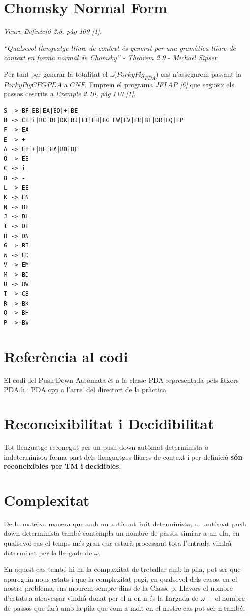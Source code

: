 \documentclass[12pt,a4paper]{report}
\def \w{$\omega$}
\def \pdaCFG{$PorkyPigCFG{PDA} $}
\def \pda{$PorkyPig_{PDA} $}
\begin{document}
\section{Chomsky Normal Form}

\textit{Veure Definició 2.8, pàg 109 [1]}.

\textit{“Qualsevol llenguatge lliure de context és generat per una gramàtica lliure de context en forma normal de Chomsky” - Theorem 2.9 - Michael Sipser}.

Per tant per generar la totalitat el L(\pda{}) ens n’assegurem passant la \pdaCFG{} a $CNF$. Emprem el programa \textit{JFLAP [6]} que segueix els passos descrits a \textit{Exemple 2.10, pàg 110 [1]}.

\begin{lstlisting}
S -> BF|EB|EA|BO|+|BE
B -> CB|i|BC|DL|DK|DJ|EI|EH|EG|EW|EV|EU|BT|DR|EQ|EP
F -> EA
E -> +
A -> EB|+|BE|EA|BO|BF
O -> EB
C -> i
D -> -
L -> EE
K -> EN
N -> BE
J -> BL
I -> DE
H -> DN
G -> BI
W -> ED
V -> EM
M -> BD
U -> BW
T -> CB
R -> BK
Q -> BH
P -> BV
\end{lstlisting}

\section{Referència al codi}

El codi del Push-Down Automata és a la classe PDA representada pels fitxers PDA.h i PDA.cpp a l'arrel del directori de la pràctica.

\section{Reconeixibilitat i Decidibilitat}

Tot llenguatge reconegut per un push-down autòmat determinista o indeterminista forma part dels llenguatges lliures de context i per definició \textbf{són reconeixibles per TM i decidibles}.

\section{Complexitat}

De la mateixa manera que amb un autòmat finit determinista, un autòmat push down determinista també contempla un nombre de passos similar a un dfa, en qualsevol cas el temps més gran que estarà processant tota l'entrada vindrà determinat per la llargada de \w{}. 

En aquest cas també hi ha la complexitat de treballar amb la pila, pot ser que apareguin nous estats i que la complexitat pugi, en qualsevol dels casos, en el nostre problema, ens mourem sempre dins de la Classe p. Llavors el nombre d'estats a atravessar vindrà donat per el n on n és la llargada de \w{} + el nombre de passos que farà amb la pila que com a molt en el nostre cas pot ser n també.
\end{document}
